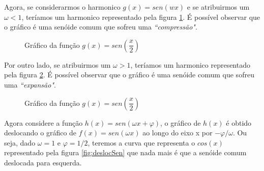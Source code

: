 Agora, se considerarmos o harmonico $g(x) = sen(wx)$ e se atribuirmos um $\omega < 1$,
teríamos um harmonico representado pela figura \ref{fig:compSen}. É possível observar
que o gráfico é uma senóide comum que sofreu uma \textit{``compressão"}.
\begin{figure}[H]
    \caption{Gráfico da função $g(x) = sen\left(\dfrac{x}{2}\right)$}
    \label{fig:compSen}
\end{figure}

Por outro lado, se atribuirmos um $\omega > 1$, teríamos um harmonico 
representado pela figura \ref{fig:expSen}. É possível observar
que o gráfico é uma senóide comum que sofreu uma \textit{``expansão"}.

\begin{figure}[H]
    \caption{Gráfico da função $g(x) = sen\left(\dfrac{x}{2}\right)$}
    \label{fig:expSen}
\end{figure}

Agora considere a função $h(x) = sen(\omega x + \varphi)$, o gráfico 
de $h(x)$ é obtido deslocando o gráfico de $f(x) = sen(\omega x)$ ao
longo do eixo x por $-\varphi/\omega$. Ou seja, dado $\omega = 1$ e 
$\varphi = 1/2$, teremos a curva que representa o $cos(x)$ representado
pela figura \ref{fig:deslocSen} que nada mais é que a senóide  comum 
deslocada para esquerda.\\

